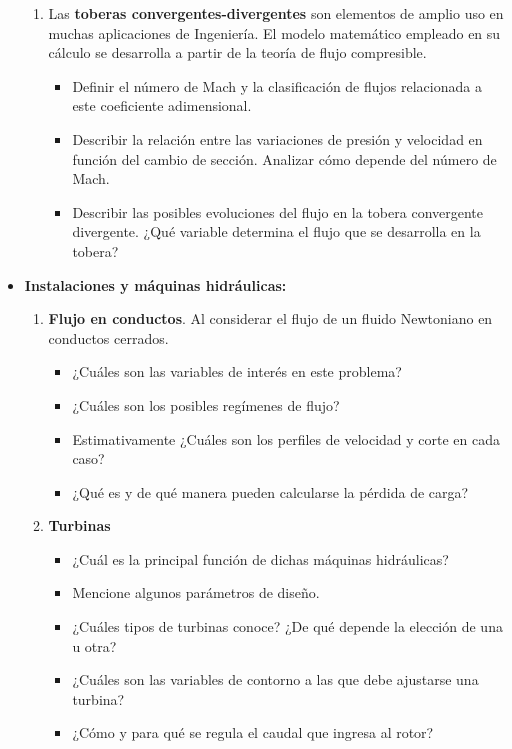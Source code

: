 \begin{itemize}
\begin{enumerate}
      
      
      \item Las {\bf toberas convergentes-divergentes} son elementos de amplio uso en muchas aplicaciones de Ingeniería. El modelo matemático
      empleado en su cálculo se desarrolla a partir de la teoría de flujo compresible.

	\begin{itemize}
	\item Definir el número de Mach y la clasificación de flujos relacionada a este coeficiente adimensional.
	\item Describir la relación entre las variaciones de presión y velocidad en función del cambio de sección.
	Analizar cómo depende del número de Mach.
	\item Describir las posibles evoluciones del flujo en la tobera convergente divergente.
	¿Qué variable determina el flujo que se desarrolla en la tobera?
	\end{itemize}
    \end{enumerate}
	
\item {\bf Instalaciones y máquinas hidráulicas:}
    \begin{enumerate}
      \item {\bf Flujo en conductos}. Al considerar el flujo de un fluido Newtoniano
      en conductos cerrados.
      \begin{itemize}
      \item ¿Cuáles son las variables de interés en este problema?
      \item ¿Cuáles son los posibles regímenes de flujo?
      \item Estimativamente ¿Cuáles son los perfiles de velocidad y corte en cada caso?
      \item ¿Qué es y de qué manera pueden calcularse la pérdida de carga?
      \end{itemize}

      \item {\bf Turbinas}
      \begin{itemize}
      \item ¿Cuál es la principal función de dichas máquinas hidráulicas?
      \item Mencione algunos parámetros de diseño.
      \item ¿Cuáles tipos de turbinas conoce? ¿De qué depende la elección de una u otra?
      \item ¿Cuáles son las variables de contorno a las que debe ajustarse una turbina?
      \item ¿Cómo y para qué se regula el caudal que ingresa al rotor?
      \end{itemize}


\end{enumerate}
\end{itemize}
